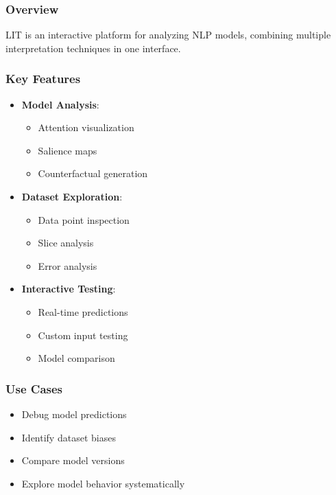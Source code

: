 \documentclass{article}
\begin{document}
\subsubsection{Overview}
LIT is an interactive platform for analyzing NLP models, combining multiple interpretation techniques in one interface.

\subsubsection{Key Features}
\begin{itemize}
    \item \textbf{Model Analysis}:
        \begin{itemize}
            \item Attention visualization
            \item Salience maps
            \item Counterfactual generation
        \end{itemize}
    \item \textbf{Dataset Exploration}:
        \begin{itemize}
            \item Data point inspection
            \item Slice analysis
            \item Error analysis
        \end{itemize}
    \item \textbf{Interactive Testing}:
        \begin{itemize}
            \item Real-time predictions
            \item Custom input testing
            \item Model comparison
        \end{itemize}
\end{itemize}

\subsubsection{Use Cases}
\begin{itemize}
    \item Debug model predictions
    \item Identify dataset biases
    \item Compare model versions
    \item Explore model behavior systematically
\end{itemize}
\end{document}
